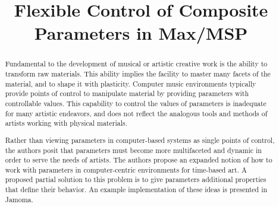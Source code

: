 \documentclass{article}
\title{Flexible Control of Composite Parameters in Max/MSP}
\begin{document}
\maketitle
\sloppy


\begin{abstract}


Fundamental to the development of musical or artistic creative work is the ability to transform raw materials. This ability implies the facility to master many facets of the material, and to shape it with plasticity. Computer music environments typically provide points of control to manipulate material by providing parameters with controllable values. This capability to control the values of parameters is inadequate for many artistic endeavors, and does not reflect the analogous tools and methods of artists working with physical materials.

Rather than viewing parameters in computer-based systems as single points of control, the authors posit that parameters must become more multifaceted and dynamic in order to serve the needs of artists. The authors propose an expanded notion of how to work with parameters in computer-centric environments for time-based art. A proposed partial solution to this problem is to give parameters additional properties that define their behavior. An example implementation of these ideas is presented in Jamoma. 

\end{abstract}

\end{document}
